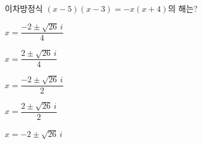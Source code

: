 이차방정식 $(x-5)(x-3)=-x(x+4)$의 해는?
\begin{choicesii}{\rule[-3ex]{0pt}{8ex}$x=\dfrac{-2\pm\sqrt{26}\,i}{4}$}{\rule[-3ex]{0pt}{8ex}$x=\dfrac{2\pm\sqrt{26}\,i}{4}$}{\rule[-3ex]{0pt}{8ex}$x=\dfrac{-2\pm\sqrt{26}\,i}{2}$}{\rule[-3ex]{0pt}{8ex}$x=\dfrac{2\pm\sqrt{26}\,i}{2}$}{\rule[-3ex]{0pt}{8ex}$x=-2\pm\sqrt{26}\,i$}\end{choicesii}
